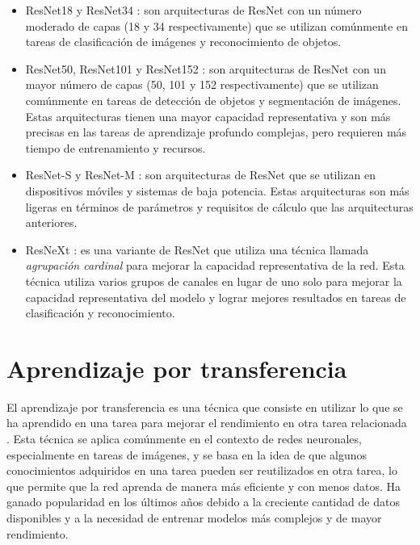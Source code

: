 \begin{itemize}
    \item ResNet18 y ResNet34 \parencite{he2016deep}: son arquitecturas de ResNet con un número moderado de capas (18 y 34 respectivamente) que se
          utilizan comúnmente en tareas de clasificación de imágenes y reconocimiento de objetos.
    \item ResNet50, ResNet101 y ResNet152 \parencite{he2016deep}: son arquitecturas de ResNet con un mayor número de capas (50, 101 y 152 respectivamente) que se
          utilizan comúnmente en tareas de detección de objetos y segmentación de imágenes. Estas arquitecturas tienen una mayor
          capacidad representativa y son más precisas en las tareas de aprendizaje profundo complejas, pero requieren más tiempo
          de entrenamiento y recursos.
    \item ResNet-S y ResNet-M \parencite{sandler2018mobilenetv2}: son arquitecturas de ResNet que se utilizan en dispositivos móviles y sistemas de baja
          potencia. Estas arquitecturas son más ligeras en términos de parámetros y requisitos de cálculo que las arquitecturas
          anteriores.
    \item ResNeXt \parencite{xie2017aggregated}: es una variante de ResNet que utiliza una técnica llamada {\it agrupación cardinal} para
          mejorar la capacidad representativa de la red. Esta técnica utiliza varios grupos de canales en lugar de uno solo para
          mejorar la capacidad representativa del modelo y lograr mejores resultados en tareas de clasificación y reconocimiento.
\end{itemize}

\section{Aprendizaje por transferencia}

El aprendizaje por transferencia es una técnica que consiste en utilizar lo que se ha aprendido en una tarea para
mejorar el rendimiento en otra tarea relacionada \parencite{thrun1998learning}. Esta técnica se aplica comúnmente en el contexto de redes neuronales, especialmente en
tareas de imágenes, y se basa en la idea de que algunos conocimientos adquiridos en una tarea pueden ser reutilizados
en otra tarea, lo que permite que la red aprenda de manera más eficiente y con menos datos. Ha ganado popularidad en
los últimos años debido a la creciente cantidad de datos disponibles y a la necesidad de entrenar modelos más complejos
y de mayor rendimiento.

